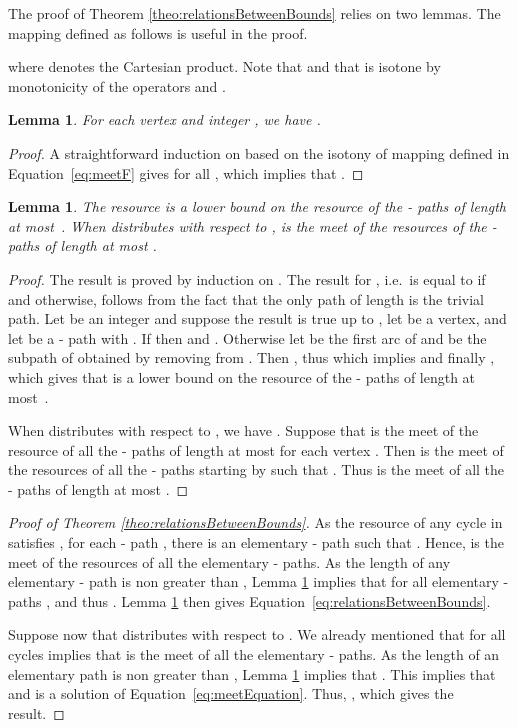 \documentclass[11pt]{amsart}
\theoremstyle{plain}
\newtheorem{lem}[theo]{Lemma}
\theoremstyle{remark}
\begin{document}
The proof of Theorem \ref{theo:relationsBetweenBounds} relies on two lemmas. The mapping  defined as follows is useful in the proof.

\noindent where  denotes the Cartesian product. Note that  and that  is isotone by monotonicity of the operators  and .

\begin{lem}\label{lem:meetEqSolSmallerThanSeq}
For each vertex  and integer , we have .
\end{lem}
\begin{proof}
A straightforward induction on  based on the isotony of mapping  defined in Equation~\eqref{eq:meetF} gives  for all , which implies that .
\end{proof}

\begin{lem}\label{lem:meetSeqAndPathsResources}
The resource  is a lower bound on the resource  of the - paths  of length at most~. 
When  distributes with respect to ,  is the meet of the resources of the - paths of length at most . 
\end{lem}



\begin{proof}
The result is proved by induction on . The result for , i.e.\  is equal to  if  and  otherwise, follows from the fact that the only path of length  is the trivial path. Let  be an integer and suppose the result is true up to , let  be a vertex, and let  be a - path with . If  then  and . Otherwise let  be the first arc of  and  be the subpath of  obtained by removing  from . Then , thus  which implies  and finally , which gives that  is a lower bound on the resource  of the - paths  of length at most~.

When  distributes with respect to , we have . Suppose that  is the meet of the resource of all the - paths of length at most  for each vertex . Then  is the meet of the resources  of all the - paths  starting by  such that . Thus  is the meet of all the - paths of length at most .
\end{proof}
\begin{proof}[Proof of Theorem \ref{theo:relationsBetweenBounds}]
As the resource of any cycle  in  satisfies , for each - path , there is an elementary - path  such that . Hence,  is the meet of the resources of all the elementary - paths. As the length of any elementary - path is non greater than , Lemma \ref{lem:meetSeqAndPathsResources} implies that  for all elementary - paths , and thus . Lemma \ref{lem:meetEqSolSmallerThanSeq} then gives Equation~\eqref{eq:relationsBetweenBounds}.

Suppose now that  distributes with respect to . We already mentioned that  for all cycles  implies that  is the meet of all the elementary - paths. 
As the length of an elementary path is non greater than , Lemma \ref{lem:meetSeqAndPathsResources} implies that . This implies that  and  is a solution of Equation~\eqref{eq:meetEquation}. Thus, , which gives the result.
\end{proof}
\end{document}
